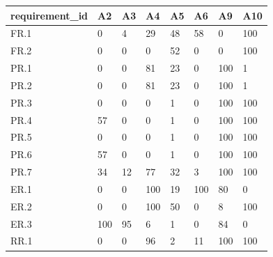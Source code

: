 \begin{tabular}{llllllll}
\hline
requirement\_id & A2 & A3 & A4 & A5 & A6 & A9 & A10 \\
\hline
FR.1 & 0 & 4 & 29 & 48 & 58 & 0 & 100 \\
FR.2 & 0 & 0 & 0 & 52 & 0 & 0 & 100 \\
PR.1 & 0 & 0 & 81 & 23 & 0 & 100 & 1 \\
PR.2 & 0 & 0 & 81 & 23 & 0 & 100 & 1 \\
PR.3 & 0 & 0 & 0 & 1 & 0 & 100 & 100 \\
PR.4 & 57 & 0 & 0 & 1 & 0 & 100 & 100 \\
PR.5 & 0 & 0 & 0 & 1 & 0 & 100 & 100 \\
PR.6 & 57 & 0 & 0 & 1 & 0 & 100 & 100 \\
PR.7 & 34 & 12 & 77 & 32 & 3 & 100 & 100 \\
ER.1 & 0 & 0 & 100 & 19 & 100 & 80 & 0 \\
ER.2 & 0 & 0 & 100 & 50 & 0 & 8 & 100 \\
ER.3 & 100 & 95 & 6 & 1 & 0 & 84 & 0 \\
RR.1 & 0 & 0 & 96 & 2 & 11 & 100 & 100 \\
\hline
\end{tabular}